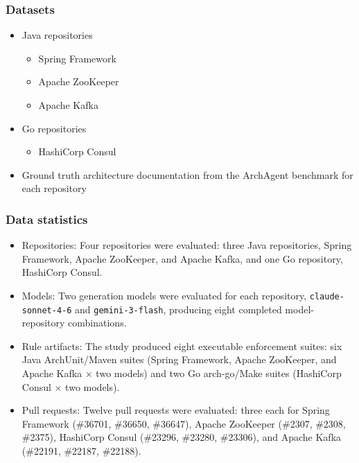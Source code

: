 \documentclass[sigconf,screen]{acmart}
\begin{document}
\subsubsection{Datasets}
\begin{itemize}
    \item Java repositories
    \begin{itemize}
        \item Spring Framework
        \item Apache ZooKeeper
        \item Apache Kafka
    \end{itemize}
    \item Go repositories
    \begin{itemize}
        \item HashiCorp Consul
    \end{itemize}
    \item Ground truth architecture documentation from the ArchAgent benchmark for each repository
\end{itemize}

\subsubsection{Data statistics}
\begin{itemize}
    \item Repositories: Four repositories were evaluated: three Java repositories, Spring Framework, Apache ZooKeeper, and Apache Kafka, and one Go repository, HashiCorp Consul.
    \item Models: Two generation models were evaluated for each repository, \texttt{claude-sonnet-4-6} and \texttt{gemini-3-flash}, producing eight completed model-repository combinations.
    \item Rule artifacts: The study produced eight executable enforcement suites: six Java ArchUnit/Maven suites (Spring Framework, Apache ZooKeeper, and Apache Kafka $\times$ two models) and two Go arch-go/Make suites (HashiCorp Consul $\times$ two models).
    \item Pull requests: Twelve pull requests were evaluated: three each for Spring Framework (\#36701, \#36650, \#36647), Apache ZooKeeper (\#2307, \#2308, \#2375), HashiCorp Consul (\#23296, \#23280, \#23306), and Apache Kafka (\#22191, \#22187, \#22188).
\end{itemize}
\end{document}
